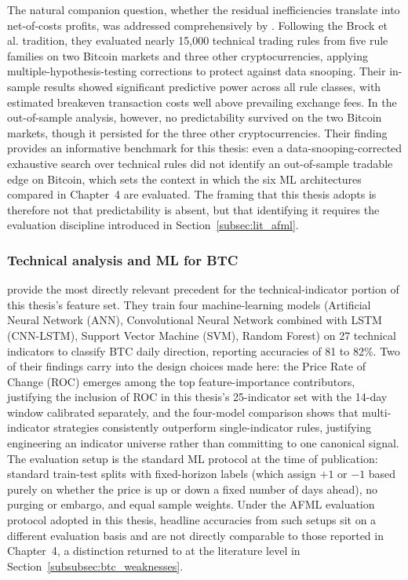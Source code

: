 The natural companion question, whether the residual inefficiencies translate into net-of-costs profits, was addressed comprehensively by \citet{hudson_urquhart_2021}. Following the Brock et al. tradition, they evaluated nearly 15{,}000 technical trading rules from five rule families on two Bitcoin markets and three other cryptocurrencies, applying multiple-hypothesis-testing corrections to protect against data snooping. Their in-sample results showed significant predictive power across all rule classes, with estimated breakeven transaction costs well above prevailing exchange fees. In the out-of-sample analysis, however, no predictability survived on the two Bitcoin markets, though it persisted for the three other cryptocurrencies. Their finding provides an informative benchmark for this thesis: even a data-snooping-corrected exhaustive search over technical rules did not identify an out-of-sample tradable edge on Bitcoin, which sets the context in which the six ML architectures compared in Chapter~4 are evaluated. The framing that this thesis adopts is therefore not that predictability is absent, but that identifying it requires the evaluation discipline introduced in Section~\ref{subsec:lit_afml}.


\subsubsection{Technical analysis and ML for BTC}\label{subsubsec:btc_ta}

\citet{mate_confluence_2024} provide the most directly relevant precedent for the technical-indicator portion of this thesis's feature set. They train four machine-learning models (Artificial Neural Network (ANN), Convolutional Neural Network combined with LSTM (CNN-LSTM), Support Vector Machine (SVM), Random Forest) on 27 technical indicators to classify BTC daily direction, reporting accuracies of 81 to 82\%. Two of their findings carry into the design choices made here: the Price Rate of Change (ROC) emerges among the top feature-importance contributors, justifying the inclusion of ROC in this thesis's 25-indicator set with the 14-day window calibrated separately, and the four-model comparison shows that multi-indicator strategies consistently outperform single-indicator rules, justifying engineering an indicator universe rather than committing to one canonical signal. The evaluation setup is the standard ML protocol at the time of publication: standard train-test splits with fixed-horizon labels (which assign $+1$ or $-1$ based purely on whether the price is up or down a fixed number of days ahead), no purging or embargo, and equal sample weights. Under the AFML evaluation protocol adopted in this thesis, headline accuracies from such setups sit on a different evaluation basis and are not directly comparable to those reported in Chapter~4, a distinction returned to at the literature level in Section~\ref{subsubsec:btc_weaknesses}.


